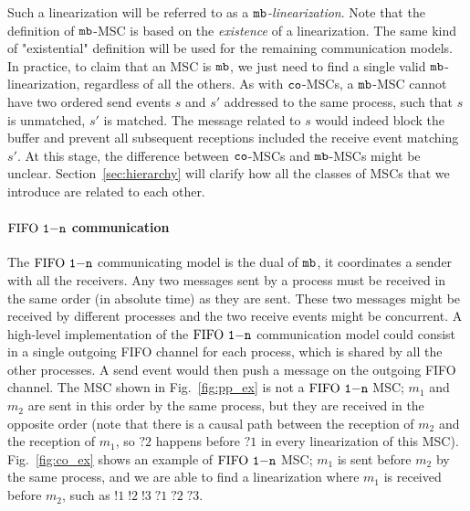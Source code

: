 Such a linearization will be referred to as a \emph{$\mathtt{mb}$-linearization}. Note that the definition of $\mathtt{mb}$-MSC is based on the \emph{existence} of a linearization. The same kind of "existential" definition will be used for the remaining communication models. In practice, to claim that an MSC is $\mathtt{mb}$, we just need to find a single valid $\mathtt{mb}$-linearization, regardless of all the others. As with $\mathtt{co}$-MSCs, a $\mathtt{mb}$-MSC cannot have two ordered send events $s$ and $s'$ addressed to the same process, such that $s$ is unmatched, $s'$ is matched. The message related to $s$ would indeed block the buffer and prevent all subsequent receptions included the receive event matching $s'$. 
%
%
At this stage, the difference between $\mathtt{co}$-MSCs and $\mathtt{mb}$-MSCs might be unclear. Section~\ref{sec:hierarchy} will clarify how all the classes of MSCs that we introduce are related to each other.


\paragraph{\bf  $\text{FIFO } \mathtt{1\mathsf{-}n}$ communication}
The $\text{FIFO } \mathtt{1\mathsf{-}n}$ communicating model is the dual of $\mathtt{mb}$, it coordinates a sender with all the receivers. Any two messages sent by a process  must be received in the same order (in absolute time) as they are sent. These two messages might be received by different processes and the two receive events might be concurrent.
A high-level implementation of the $\text{FIFO } \mathtt{1\mathsf{-}n}$ communication model could consist in a single outgoing FIFO channel for each process, which is shared by all the other processes. A send event would then push a message on the outgoing FIFO channel.
The MSC shown in Fig.~\ref{fig:pp_ex} is not a $\text{FIFO } \mathtt{1\mathsf{-}n}$ MSC; $m_1$ and $m_2$ are sent in this order by the same process, but they are received in the opposite order (note that there is a causal path between the reception of $m_2$ and the reception of $m_1$, so $?2$ happens before $?1$ in every linearization of this MSC). Fig.~\ref{fig:co_ex} shows an example of $\text{FIFO } \mathtt{1\mathsf{-}n}$ MSC; $m_1$ is sent before $m_2$ by the same process, and we are able to find a linearization where $m_1$ is received before $m_2$, such as $!1\;!2\;!3\;?1\;?2\;?3$. 

